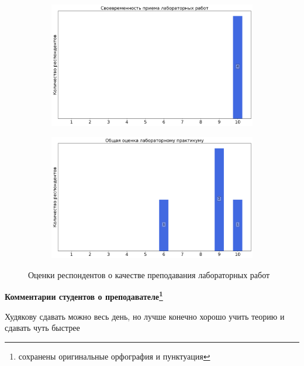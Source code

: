 \begin{figure}[H]
\begin{subfigure}[b]{0.45\textwidth}
				\includegraphics[width=\textwidth]{images/2 course/Общая физика - электричество и магнетизм/labniks-marks-Худяков А.Д.-2.png}
			\end{subfigure}
			\begin{subfigure}[b]{0.45\textwidth}
				\centering
				\includegraphics[width=\textwidth]{images/2 course/Общая физика - электричество и магнетизм/labniks-marks-Худяков А.Д.-3.png}
			\end{subfigure}	
			\caption{Оценки респондентов о качестве преподавания лабораторных работ}
		\end{figure}

		\textbf{Комментарии студентов о преподавателе\protect\footnote{сохранены оригинальные орфография и пунктуация}}
			\begin{commentbox} 
				Худякову сдавать можно весь день, но лучше конечно хорошо учить теорию и сдавать чуть быстрее 
			\end{commentbox}


